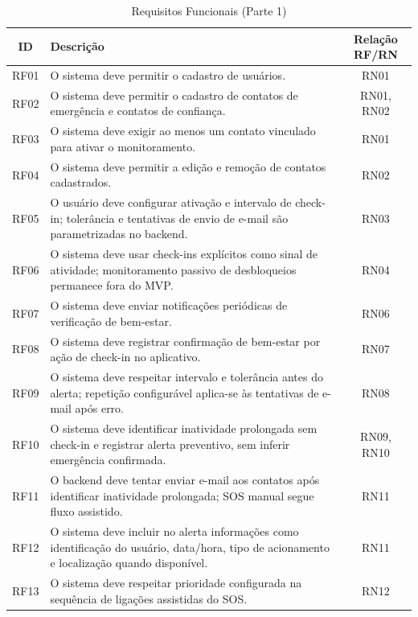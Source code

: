 \begin{table}[H]
\caption{Requisitos Funcionais (Parte 1)}
\label{quad_rf1}
\centering
\begin{tabular}{|c|p{8cm}|c|}
\hline
\textbf{ID} & \textbf{Descrição} & \textbf{Relação RF/RN} \\
\hline
RF01 & O sistema deve permitir o cadastro de usuários. & RN01 \\
\hline
RF02 & O sistema deve permitir o cadastro de contatos de emergência e contatos de confiança. & RN01, RN02 \\
\hline
RF03 & O sistema deve exigir ao menos um contato vinculado para ativar o monitoramento. & RN01 \\
\hline
RF04 & O sistema deve permitir a edição e remoção de contatos cadastrados. & RN02 \\
\hline
RF05 & O usuário deve configurar ativação e intervalo de check-in; tolerância e tentativas de envio de e-mail são parametrizadas no backend. & RN03 \\
\hline
RF06 & O sistema deve usar check-ins explícitos como sinal de atividade; monitoramento passivo de desbloqueios permanece fora do MVP. & RN04 \\
\hline
RF07 & O sistema deve enviar notificações periódicas de verificação de bem-estar. & RN06 \\
\hline
RF08 & O sistema deve registrar confirmação de bem-estar por ação de check-in no aplicativo. & RN07 \\
\hline
RF09 & O sistema deve respeitar intervalo e tolerância antes do alerta; repetição configurável aplica-se às tentativas de e-mail após erro. & RN08 \\
\hline
RF10 & O sistema deve identificar inatividade prolongada sem check-in e registrar alerta preventivo, sem inferir emergência confirmada. & RN09, RN10 \\
\hline
RF11 & O backend deve tentar enviar e-mail aos contatos após identificar inatividade prolongada; SOS manual segue fluxo assistido. & RN11 \\
\hline
RF12 & O sistema deve incluir no alerta informações como identificação do usuário, data/hora, tipo de acionamento e localização quando disponível. & RN11 \\
\hline
RF13 & O sistema deve respeitar prioridade configurada na sequência de ligações assistidas do SOS. & RN12 \\
\hline

\end{tabular}

\end{table}

